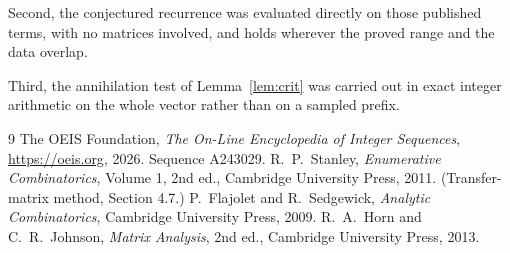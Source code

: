 \documentclass[11pt,a4paper]{article}
\theoremstyle{plain}
\theoremstyle{definition}
\begin{document}
Second, the conjectured recurrence was evaluated directly on those published terms, with no
matrices involved, and holds wherever the proved range and the data overlap.

Third, the annihilation test of Lemma~\ref{lem:crit} was carried out in exact integer
arithmetic on the whole vector rather than on a sampled prefix.

\begin{thebibliography}{9}
 The OEIS Foundation, \emph{The On-Line Encyclopedia of Integer
Sequences}, \url{https://oeis.org}, 2026. Sequence A243029.
 R.~P.~Stanley, \emph{Enumerative Combinatorics}, Volume 1, 2nd ed.,
Cambridge University Press, 2011. (Transfer-matrix method, Section 4.7.)
 P.~Flajolet and R.~Sedgewick, \emph{Analytic Combinatorics}, Cambridge
University Press, 2009.
 R.~A.~Horn and C.~R.~Johnson, \emph{Matrix Analysis}, 2nd ed., Cambridge
University Press, 2013.
\end{thebibliography}
\end{document}
